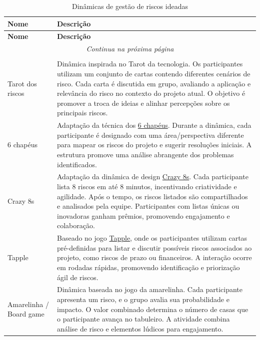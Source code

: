 \documentclass[
	12pt,
	openright,
	twoside,
	a4paper,
	english,
	brazil
	]{abntex2}
\begin{document}
\begin{longtable}{|p{3cm}|p{12cm}|}
  \caption{Dinâmicas de gestão de riscos ideadas} \label{tab:dinamicas} \\ \hline
  \textbf{Nome} & \textbf{Descrição} \\ \hline
  \endfirsthead
  \hline
  \textbf{Nome} & \textbf{Descrição} \\ \hline
  \endhead
  \hline
  \multicolumn{2}{|c|}{\textit{Continua na próxima página}} \\ \hline
  \endfoot
  \hline
  \multicolumn{2}{|c|}{\textit{Fim da tabela}} \\ \hline
  \endlastfoot
  Tarot dos riscos & Dinâmica inspirada no Tarot da tecnologia. Os participantes utilizam um conjunto de cartas contendo diferentes cenários de risco. Cada carta é discutida em grupo, avaliando a aplicação e relevância do risco no contexto do projeto atual. O objetivo é promover a troca de ideias e alinhar percepções sobre os principais riscos. \\ \hline
  6 chapéus & Adaptação da técnica dos \href{https://brasil.uxdesign.cc/escolhendo-ferramentas-six-thinking-hats-2e30da00ec9b}{6 chapéus}. Durante a dinâmica, cada participante é designado com uma área/perspectiva diferente para mapear os riscos do projeto e sugerir resoluções iniciais. A estrutura promove uma análise abrangente dos problemas identificados. \\ \hline
  Crazy 8s & Adaptação da dinâmica de design \href{https://laboratoriobridge.github.io/bthinking/pt/methods/crazy8/}{Crazy 8s}. Cada participante lista 8 riscos em até 8 minutos, incentivando criatividade e agilidade. Após o tempo, os riscos listados são compartilhados e analisados pela equipe. Participantes com listas únicas ou inovadoras ganham prêmios, promovendo engajamento e colaboração. \\ \hline
  Tapple & Baseado no jogo \href{https://ludopedia.com.br/jogo/tapple}{Tapple}, onde os participantes utilizam cartas pré-definidas para listar e discutir possíveis riscos associados ao projeto, como riscos de prazo ou financeiros. A interação ocorre em rodadas rápidas, promovendo identificação e priorização ágil de riscos. \\ \hline
  Amarelinha / Board game & Dinâmica baseada no jogo da amarelinha. Cada participante apresenta um risco, e o grupo avalia sua probabilidade e impacto. O valor combinado determina o número de casas que o participante avança no tabuleiro. A atividade combina análise de risco e elementos lúdicos para engajamento. \\ \hline

\end{longtable}
\end{document}
